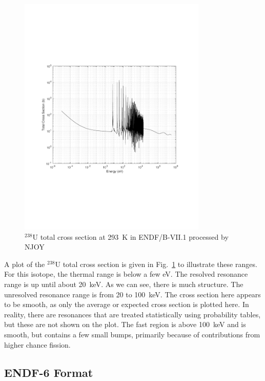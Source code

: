 \begin{figure}[tb!]
\begin{center}
\includegraphics[trim={3.75cm 6.75cm 3.75cm 6.75cm}, width=0.8\textwidth]{./Figures/u238_totalXS_293k.pdf}
\caption{$^{238}$U total cross section at 293~K in ENDF/B-VII.1 processed by NJOY}
\label{Fig:libraryGeneration_u238_totalXS_293K}
\end{center}
\end{figure}

A plot of the $^{238}$U total cross section is given in Fig.~\ref{Fig:libraryGeneration_u238_totalXS_293K} to illustrate these ranges. For this isotope, the thermal range is below a few eV. The resolved resonance range is up until about 20~keV. As we can see, there is much structure. The unresolved resonance range is from 20 to 100~keV. The cross section here appears to be smooth, as only the average or expected cross section is plotted here. In reality, there are resonances that are treated statistically using probability tables, but these are not shown on the plot. The fast region is above 100~keV and is smooth, but contains a few small bumps, primarily because of contributions from higher chance fission.

\subsection{ENDF-6 Format}

